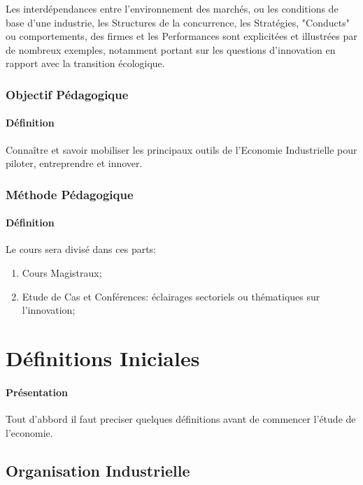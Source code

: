 \documentclass{article}
\begin{document}
\noindent Les interdépendances entre l'environnement des marchés, ou les conditions de base d'une industrie, les Structures de la concurrence, les Stratégies, "Conducts" ou comportements, des firmes et les Performances sont explicitées et illustrées par de nombreux exemples, notamment portant sur les questions d'innovation en rapport avec la transition écologique.

\subsubsection{Objectif Pédagogique}
\paragraph{Définition}Connaître et savoir mobiliser les principaux outils de l'Economie Industrielle pour piloter, entreprendre et innover.

\subsubsection{Méthode Pédagogique}
\paragraph{Définition}Le cours sera divisé dans ces parts:
\begin{enumerate}[noitemsep]
    \item Cours Magistraux;
    \item Etude de Cas et Conférences: éclairages sectoriels ou thématiques sur l'innovation;
\end{enumerate}


\section{Définitions Iniciales}
\paragraph{Présentation}Tout d'abbord il faut preciser quelques définitions avant de commencer l'étude de l'economie.

\subsection{Organisation Industrielle}
\end{document}
